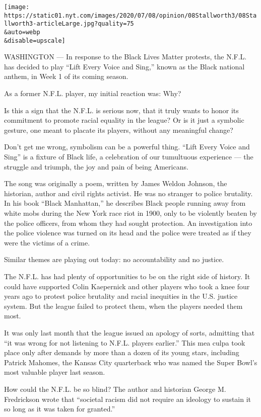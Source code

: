 \texttt{[image: https://static01.nyt.com/images/2020/07/08/opinion/08Stallworth3/08Stallworth3-articleLarge.jpg?quality=75\\\&auto=webp\\\&disable=upscale]}

WASHINGTON --- In response to the Black Lives Matter protests, the
N.F.L. has decided to play ``Lift Every Voice and Sing,'' known as the
Black national anthem, in Week 1 of its coming season.

As a former N.F.L. player, my initial reaction was: Why?

Is this a sign that the N.F.L. is serious now, that it truly wants to
honor its commitment to promote racial equality in the league? Or is it
just a symbolic gesture, one meant to placate its players, without any
meaningful change?

Don't get me wrong, symbolism can be a powerful thing. ``Lift Every
Voice and Sing'' is a fixture of Black life, a celebration of our
tumultuous experience --- the struggle and triumph, the joy and pain of
being Americans.

The song was originally a poem, written by James Weldon Johnson, the
historian, author and civil rights activist. He was no stranger to
police brutality. In his book ``Black Manhattan,'' he describes Black
people running away from white mobs during the New York race riot in
1900, only to be violently beaten by the police officers, from whom they
had sought protection. An investigation into the police violence was
turned on its head and the police were treated as if they were the
victims of a crime.

Similar themes are playing out today: no accountability and no justice.

The N.F.L. has had plenty of opportunities to be on the right side of
history. It could have supported Colin Kaepernick and other players who
took a knee four years ago to protest police brutality and racial
inequities in the U.S. justice system. But the league failed to protect
them, when the players needed them most.

It was only last month that the league issued an apology of sorts,
admitting that ``it was wrong for not listening to N.F.L. players
earlier.'' This mea culpa took place only after demands by more than a
dozen of its young stars, including Patrick Mahomes, the Kansas City
quarterback who was named the Super Bowl's most valuable player last
season.

How could the N.F.L. be so blind? The author and historian George M.
Fredrickson wrote that ``societal racism did not require an ideology to
sustain it so long as it was taken for granted.''


